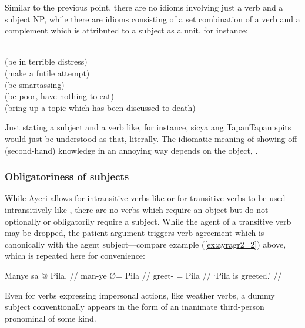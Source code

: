 Similar to the previous point, there are no idioms involving just a verb and a
subject NP, while there are idioms consisting of a set combination of a verb
and a complement which is attributed to a subject as a unit, for instance:

\pex\label{ex:ayridms}
\a {} \\
	(be in terrible distress)
\a {} \\
	(make a futile attempt)
\a {} \\
	(be smartassing)
\a {} \\
	(be poor, have nothing to eat)
\a {} \\
	(bring up a topic which has been discussed to death)
\xe

Just stating a subject and a verb like, for instance, 
{sicya ang Tapan}{Tapan spits} would just be understood as that, literally. The
idiomatic meaning of showing off (second-hand) knowledge in an annoying way
depends on the object, .

\subsubsection{Obligatoriness of subjects}

While Ayeri allows for intransitive verbs like  or for
transitive verbs to be used intransitively like ,
there are no verbs which require an object but do not optionally or
obligatorily require a subject. While the agent of a transitive verb may be
dropped, the patient argument triggers verb agreement which is canonically with
the agent subject---compare example (\ref{ex:ayragr2_2}) above, which is
repeated here for convenience:

\ex\begingl
	\gla Manye sa @ Pila. //
	\glb man-ye Ø= Pila //
	\glc greet-\TsgF{} \Parg{}= Pila //
	\glft `Pila is greeted.' //
\endgl\xe

Even for verbs expressing impersonal actions, like weather verbs, a dummy
subject conventionally appears in the form of an inanimate third-person
pronominal of some kind.

